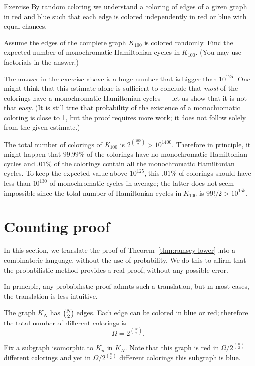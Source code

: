 \begin{thm}{Exercise}
By random coloring we understand a coloring of edges of a given graph in red and blue such that each edge is colored independently in red or blue with equal chances. 

Assume the edges of the complete graph $K_{100}$ is colored randomly. 
Find the expected number of monochromatic Hamiltonian cycles in $K_{100}$.
(You may use factorials in the answer.)
\end{thm} 

The answer in the exercise above is a huge number that is bigger than $10^{125}$.
One might think that this estimate alone is sufficient to conclude that {}\emph{most} of the colorings have a monochromatic Hamiltonian cycles --- let us show that it is not that easy.
(It is still true that probability of the existence of a monochromatic coloring is close to 1, but the proof requires more work; it does not follow solely from the given estimate.)

The total number of colorings of $K_{100}$ is $2^{\binom{100}2}>10^{1400}$.
Therefore in principle, it might happen that $99.99\%$ of the colorings have no monochromatic Hamiltonian cycles and $.01\%$ of the colorings contain all the monochromatic Hamiltonian cycles.
To keep the expected value above $10^{125}$,
this $.01\%$ of colorings should have less than $10^{130}$ of monochromatic cycles in average;
the latter does not seem impossible since the total number of Hamiltonian cycles in $K_{100}$ is $99!/2>10^{155}$.

\section*{Counting proof}

In this section, we translate the proof of Theorem~\ref{thm:ramsey-lower} into a combinatoric language, without the use of probability.
We do this to affirm that the probabilistic method provides a real proof, without any possible error.

In principle,  any probabilistic proof admits such a translation,
but in most cases, the translation is less intuitive. 

The graph $K_N$ has $\tbinom{N}{2}$ edges.
Each edge can be colored in blue or red;
therefore the total number of different colorings is \[\Omega=2^{\binom{N}{2}}.\]

Fix a subgraph isomorphic to $K_n$ in $K_N$.
Note that this graph is red in $\Omega/2^{\binom n2}$ different colorings
and yet in $\Omega/2^{\binom n2}$ different colorings this subgraph is blue.

